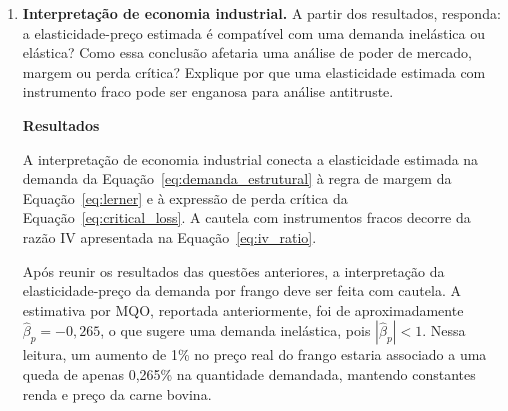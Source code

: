 \documentclass[12pt,a4paper]{article}
\begin{document}
\begin{enumerate}[label=\textbf{\arabic*.}]
    No que concerne aos intervalos convencionais baseados na aproximação normal do 2SLS, temos que essa falha grosseiramente ao estimar por instrumentos fracos. Os estimadores, com isso, são enviesados e os intervalos imprecisos, bem como o apresentado pela especificação \textit{Z\textsubscript{1}}. Com o propósito de solucionar esse problema, aplica-se as geometrias de AR e CLR. A cobertura de 95\% em grandes amostras é preservada por esses testes, independentemente do tamanho da amostra. 

    Como discutido anteriormente, apesar das magnitudes dispostas obedecerem a regra de bolso, as variáveis exógenas provavelmente não satisfazem a condição de exogeneidade, podendo refletir nos conjuntos vazios do teste AR. Entende-se por ele que não existem parâmetros que tornem as restrições sobre-identificadoras aceitas, rejeitando universalmente o modelo. Entretanto, se a abordagem adotada for proveniente do teste CRL, argumenta-se os resultados a partir dos intervalos fechados da tabela. Desse modo, a preferência pelos testes oferece visões distintas. O teste AR é geralmente mais preciso e robusto. Por outro lado, costuma a ser ineficiente para muitos instrumentos sobre-identificados.

\item \textbf{Interpretação de economia industrial.} A partir dos resultados,
    responda: a elasticidade-preço estimada é compatível com uma demanda
    inelástica ou elástica? Como essa conclusão afetaria uma análise de poder de
    mercado, margem ou perda crítica? Explique por que uma elasticidade estimada
    com instrumento fraco pode ser enganosa para análise antitruste.


\textbf{Resultados}

A interpretação de economia industrial conecta a elasticidade estimada na demanda da Equação~\eqref{eq:demanda_estrutural} à regra de margem da Equação~\eqref{eq:lerner} e à expressão de perda crítica da Equação~\eqref{eq:critical_loss}. A cautela com instrumentos fracos decorre da razão IV apresentada na Equação~\eqref{eq:iv_ratio}.

Após reunir os resultados das questões anteriores, a interpretação da elasticidade-preço da demanda por frango deve ser feita com cautela. A estimativa por MQO, reportada anteriormente, foi de aproximadamente $\hat{\beta}_p=-0{,}265$, o que sugere uma demanda inelástica, pois $|\hat{\beta}_p|<1$. Nessa leitura, um aumento de 1\% no preço real do frango estaria associado a uma queda de apenas 0,265\% na quantidade demandada, mantendo constantes renda e preço da carne bovina.


\end{enumerate}
\end{document}
